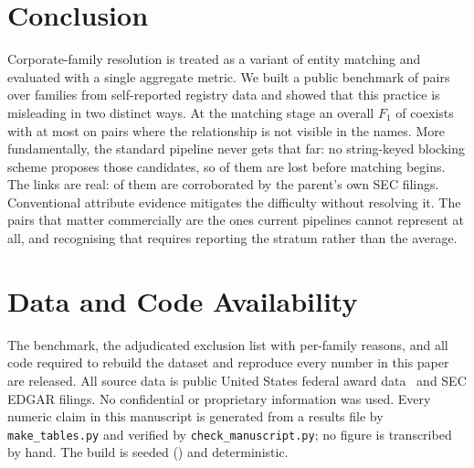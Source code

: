 \section{Conclusion}

Corporate-family resolution is treated as a variant of entity matching and evaluated with
a single aggregate metric. We built a public benchmark of \BenchPairs pairs over
\BenchFamilies families from self-reported registry data and showed that this practice is
misleading in two distinct ways. At the matching stage an overall $F_1$ of \BestOverallF
coexists with at most \AnyInvisibleFMax on pairs where the relationship is not visible in
the names. More fundamentally, the standard pipeline never gets that far: no string-keyed
blocking scheme proposes those candidates, so \BlkInvisibleLost of them are lost before
matching begins. The links are real: \EdgarInvisibleConfirmPct of them are corroborated
by the parent's own SEC filings. Conventional attribute evidence mitigates the
difficulty without resolving it. The pairs that matter commercially are the ones current pipelines
cannot represent at all, and recognising that requires reporting the stratum rather than
the average.

\section*{Data and Code Availability}

The benchmark, the adjudicated exclusion list with per-family reasons, and all code
required to rebuild the dataset and reproduce every number in this paper are released. All
source data is public United States federal award data~\citep{usaspending_api} and SEC
EDGAR filings. No confidential or proprietary information was used. Every numeric claim in
this manuscript is generated from a results file by \texttt{make\_tables.py} and verified
by \texttt{check\_manuscript.py}; no figure is transcribed by hand. The build is seeded
(\BenchSeed) and deterministic.
